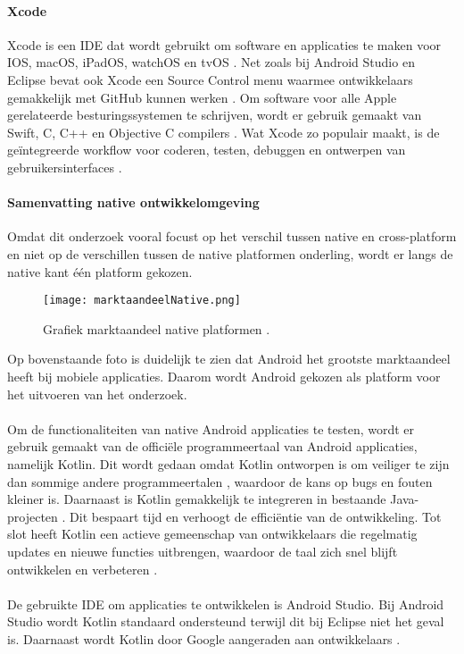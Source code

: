\paragraph{Xcode}
Xcode is een IDE dat wordt gebruikt om software en applicaties te maken voor IOS, macOS, 
iPadOS, watchOS en tvOS \autocite{jahnavisarora2020}. Net zoals bij Android Studio en 
Eclipse bevat ook Xcode een Source Control menu waarmee ontwikkelaars gemakkelijk met GitHub 
kunnen werken \autocite{Medewar2022}. Om software voor alle Apple gerelateerde besturingssystemen 
te schrijven, wordt er gebruik gemaakt van Swift, C, C++ en Objective C compilers 
\autocite{jahnavisarora2020}. Wat Xcode zo populair maakt, is de geïntegreerde workflow 
voor coderen, testen, debuggen en ontwerpen van gebruikersinterfaces \autocite{jahnavisarora2020}.

\paragraph{Samenvatting native ontwikkelomgeving}
Omdat dit onderzoek vooral focust op het verschil tussen native en cross-platform en niet 
op de verschillen tussen de native platformen onderling, wordt er langs de native kant één platform gekozen.
\begin{figure}[H]
    \centering
    \texttt{[image: marktaandeelNative.png]}
    \caption{Grafiek marktaandeel native platformen \parencite{Monus2023}.}
\end{figure}
Op bovenstaande foto is duidelijk te zien dat Android het grootste marktaandeel heeft bij mobiele 
applicaties. Daarom wordt Android gekozen als platform voor het uitvoeren van het onderzoek.
\\\\
Om de functionaliteiten van native Android applicaties 
te testen, wordt er gebruik gemaakt van de officiële programmeertaal van Android applicaties, 
namelijk Kotlin. Dit wordt gedaan omdat Kotlin ontworpen is om veiliger te zijn dan 
sommige andere programmeertalen \autocite{Kesavan2021}, waardoor de kans op bugs en 
fouten kleiner is. Daarnaast is Kotlin gemakkelijk te integreren in bestaande 
Java-projecten \autocite{Kesavan2021}. Dit bespaart tijd en verhoogt de efficiëntie 
van de ontwikkeling. Tot slot heeft Kotlin een actieve gemeenschap van ontwikkelaars 
die regelmatig updates en nieuwe functies uitbrengen, waardoor de taal zich snel blijft 
ontwikkelen en verbeteren \autocite{Patel2023}.
\\\\
De gebruikte IDE om applicaties te ontwikkelen is Android Studio. Bij Android Studio wordt 
Kotlin standaard ondersteund terwijl dit bij Eclipse niet het geval is. Daarnaast wordt Kotlin 
door Google aangeraden aan ontwikkelaars \autocite{Medewar2022}.

